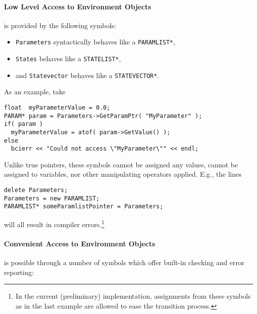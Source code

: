 \documentclass[12pt,letterpaper]{article}
\begin{document}
\paragraph{Low Level Access to Environment Objects}
is provided by the following symbols:

\begin{itemize}
\item \texttt{Parameters} syntactically behaves like a \texttt{PARAMLIST*},
\item \texttt{States} behaves like a \texttt{STATELIST*},
\item and \texttt{Statevector} behaves like a \texttt{STATEVECTOR*}.
\end{itemize}
As an example, take
\begin{verbatim}
float  myParameterValue = 0.0;
PARAM* param = Parameters->GetParamPtr( "MyParameter" );
if( param )
  myParameterValue = atof( param->GetValue() );
else
  bcierr << "Could not access \"MyParameter\"" << endl;
\end{verbatim}
Unlike true pointers, these symbols cannot be assigned any values,
cannot be assigned to variables, nor other manipulating operators applied.
E.g., the lines
\begin{verbatim}
delete Parameters;
Parameters = new PARAMLIST;
PARAMLIST* someParamlistPointer = Parameters;
\end{verbatim}
will all result in compiler errors.\footnote{In the current (preliminary)
implementation, assignments from these symbols as in the last example are
allowed to ease the transition process.}

\paragraph{Convenient Access to Environment Objects}
is possible through a number of symbols which offer 
built-in checking and error reporting:
\end{document}

